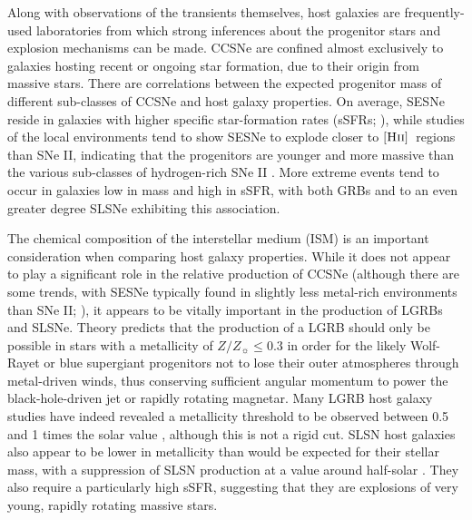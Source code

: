 \documentclass[fleqn,usenatbib,]{mnras}
\newcommand{\replychris}[1]{\color{magenta}#1 \color{black}}
\newcommand{\replylluis}[1]{\color{green}#1 \color{black}}
\newcommand{\HII}[0]{$[\textnormal{\textsc{Hii}}]$}
\begin{document}
 Along with observations of the transients themselves, host galaxies are frequently-used laboratories from which strong inferences about the progenitor stars and explosion mechanisms can be made. CCSNe are confined almost exclusively to galaxies hosting recent or ongoing star formation, due to their origin from massive stars. There are correlations between the expected progenitor mass of different sub-classes of CCSNe and host galaxy properties. On average, SESNe reside in galaxies with higher specific star-formation rate\replychris{s} (sSFRs; \citealt{James2006,Kelly2008}), \replylluis{while studies of the local environments tend to show SESNe to explode closer to \HII~regions than SNe II, indicating that the progenitors are younger and more massive than the various sub-classes of hydrogen-rich SNe II  \citep[e.g.][]{Galbany2018}}. More extreme events tend to occur in galaxies low in mass and high in sSFR, with both GRBs \citep[e.g.][]{Fruchter2006,LeFloch2006,Levesque2010,Kruehler2015,Vergani2015,Perley2016b,Palmerio2019,Taggart2019} and to an even greater degree SLSNe \citep[e.g.][]{Neill2011,Lunnan2014,Leloudas2015,Angus2016,Schulze2018,Taggart2019} exhibiting this association.
 
 The chemical composition of the interstellar medium (ISM) is an important consideration when comparing host galaxy properties. While it does not appear to play a significant role in the relative production of CCSNe (although there are some trends, with SESNe typically found in slightly less metal-rich environments than SNe II; \citealt{Galbany2018}), it appears to be vitally important in the production of LGRBs and SLSNe. Theory predicts that the production of a LGRB should only be possible in stars with a metallicity of $Z/Z_{\sun}\leq 0.3$ \citep{Woosley1993}  in order for the likely Wolf-Rayet or blue supergiant progenitors not to lose their outer atmospheres through metal-driven winds, thus conserving sufficient angular momentum to power the black-hole-driven jet or rapidly rotating magnetar. Many LGRB host galaxy studies have indeed revealed a metallicity threshold to be observed between 0.5 and 1 times the solar value \citep[e.g.][]{Stanek2006,Modjaz2008,Kruehler2015,Perley2016b,Japelj2016,Vergani2017}, although this is not a rigid cut.  
SLSN host galaxies also appear to be lower in metallicity than would be expected for their stellar mass, with a suppression of SLSN production at a value around half-solar \citep{Lunnan2014,Chen2016a,Perley2016c}. They also require a particularly high sSFR, suggesting that they are explosions of very young, rapidly rotating massive stars.
 
\end{document}
